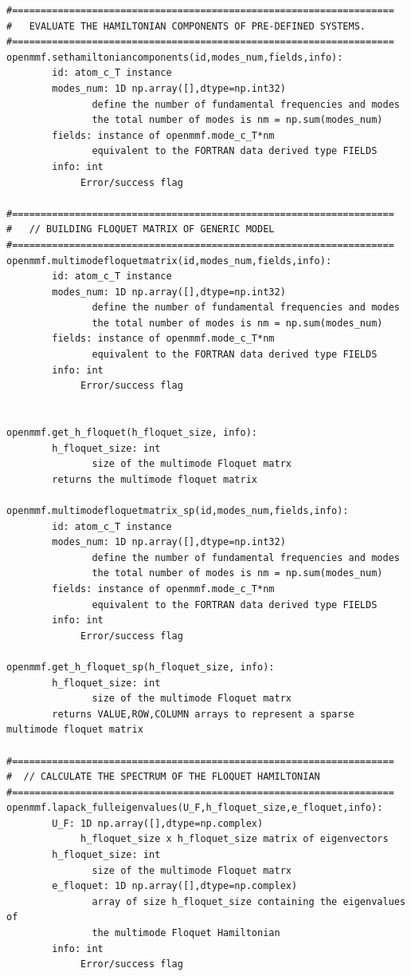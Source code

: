 \documentclass[10pt,a4paper]{article}
\begin{document}
\begin{verbatim}
#===================================================================
#   EVALUATE THE HAMILTONIAN COMPONENTS OF PRE-DEFINED SYSTEMS. 
#===================================================================
openmmf.sethamiltoniancomponents(id,modes_num,fields,info):
        id: atom_c_T instance
        modes_num: 1D np.array([],dtype=np.int32)
               define the number of fundamental frequencies and modes
               the total number of modes is nm = np.sum(modes_num)
        fields: instance of openmmf.mode_c_T*nm 
               equivalent to the FORTRAN data derived type FIELDS
        info: int
             Error/success flag
        
#===================================================================
#   // BUILDING FLOQUET MATRIX OF GENERIC MODEL
#===================================================================
openmmf.multimodefloquetmatrix(id,modes_num,fields,info):
        id: atom_c_T instance
        modes_num: 1D np.array([],dtype=np.int32)
               define the number of fundamental frequencies and modes
               the total number of modes is nm = np.sum(modes_num)
        fields: instance of openmmf.mode_c_T*nm 
               equivalent to the FORTRAN data derived type FIELDS
        info: int
             Error/success flag


openmmf.get_h_floquet(h_floquet_size, info):
        h_floquet_size: int
               size of the multimode Floquet matrx
        returns the multimode floquet matrix

openmmf.multimodefloquetmatrix_sp(id,modes_num,fields,info):
        id: atom_c_T instance
        modes_num: 1D np.array([],dtype=np.int32)
               define the number of fundamental frequencies and modes
               the total number of modes is nm = np.sum(modes_num)
        fields: instance of openmmf.mode_c_T*nm 
               equivalent to the FORTRAN data derived type FIELDS
        info: int
             Error/success flag

openmmf.get_h_floquet_sp(h_floquet_size, info):
        h_floquet_size: int
               size of the multimode Floquet matrx
        returns VALUE,ROW,COLUMN arrays to represent a sparse multimode floquet matrix

#===================================================================
#  // CALCULATE THE SPECTRUM OF THE FLOQUET HAMILTONIAN
#===================================================================
openmmf.lapack_fulleigenvalues(U_F,h_floquet_size,e_floquet,info):    
        U_F: 1D np.array([],dtype=np.complex)
             h_floquet_size x h_floquet_size matrix of eigenvectors            
        h_floquet_size: int
               size of the multimode Floquet matrx
        e_floquet: 1D np.array([],dtype=np.complex)
               array of size h_floquet_size containing the eigenvalues of
               the multimode Floquet Hamiltonian
        info: int
             Error/success flag


\end{verbatim}
\end{document}
